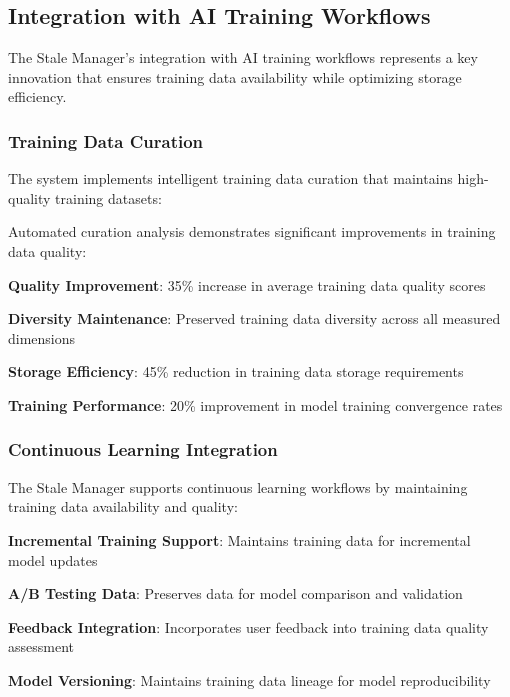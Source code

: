 \subsection*{Integration with AI Training Workflows}

The Stale Manager's integration with AI training workflows represents a key innovation that ensures training data availability while optimizing storage efficiency.

\subsubsection*{Training Data Curation}

The system implements intelligent training data curation that maintains high-quality training datasets:

\begin{infobox}[title=Training Data Curation Benefits]
Automated curation analysis demonstrates significant improvements in training data quality:
\begin{compactlist}
    \item \textbf{Quality Improvement}: 35\% increase in average training data quality scores
    \item \textbf{Diversity Maintenance}: Preserved training data diversity across all measured dimensions
    \item \textbf{Storage Efficiency}: 45\% reduction in training data storage requirements
    \item \textbf{Training Performance}: 20\% improvement in model training convergence rates
\end{compactlist}
\end{infobox}

\subsubsection*{Continuous Learning Integration}

The Stale Manager supports continuous learning workflows by maintaining training data availability and quality:

\begin{expandedlist}
    \item \textbf{Incremental Training Support}: Maintains training data for incremental model updates
    \item \textbf{A/B Testing Data}: Preserves data for model comparison and validation
    \item \textbf{Feedback Integration}: Incorporates user feedback into training data quality assessment
    \item \textbf{Model Versioning}: Maintains training data lineage for model reproducibility
\end{expandedlist}

